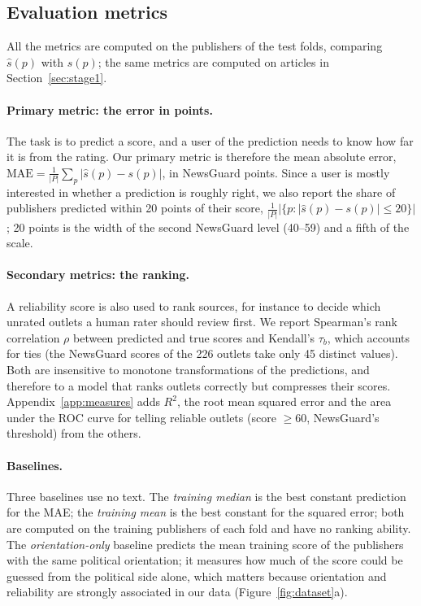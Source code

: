 \documentclass[11pt,a4paper]{article}
\begin{document}
\subsection{Evaluation metrics}\label{sec:metrics}
All the metrics are computed on the publishers of the test folds, comparing $\hat{s}(p)$ with $s(p)$; the same metrics
are computed on articles in Section~\ref{sec:stage1}.

\paragraph{Primary metric: the error in points.}
The task is to predict a score, and a user of the prediction needs to know how far it is from the rating. Our primary
metric is therefore the mean absolute error, $\mathrm{MAE} = \frac{1}{|P|} \sum_{p} |\hat{s}(p) - s(p)|$, in NewsGuard
points. Since a user is mostly interested in whether a prediction is roughly right, we also report the share of
publishers predicted within 20 points of their score, $\frac{1}{|P|} |\{p : |\hat{s}(p) - s(p)| \leq 20\}|$; 20 points
is the width of the second NewsGuard level (40--59) and a fifth of the scale.

\paragraph{Secondary metrics: the ranking.}
A reliability score is also used to rank sources, for instance to decide which unrated outlets a human rater should
review first. We report Spearman's rank correlation $\rho$ between predicted and true scores and Kendall's $\tau_b$,
which accounts for ties (the NewsGuard scores of the 226 outlets take only 45 distinct values). Both are insensitive to
monotone transformations of the predictions, and therefore to a model that ranks outlets correctly but compresses their
scores. Appendix~\ref{app:measures} adds $R^2$, the root mean squared error and the area under the ROC curve for telling
reliable outlets (score $\geq 60$, NewsGuard's threshold) from the others.

\paragraph{Baselines.}
Three baselines use no text. The \emph{training median} is the best constant prediction for the MAE; the
\emph{training mean} is the best constant for the squared error; both are computed on the training publishers of each
fold and have no ranking ability. The \emph{orientation-only} baseline predicts the mean training score of the
publishers with the same political orientation; it measures how much of the score could be guessed from the political
side alone, which matters because orientation and reliability are strongly associated in our data
(Figure~\ref{fig:dataset}a).
\end{document}

